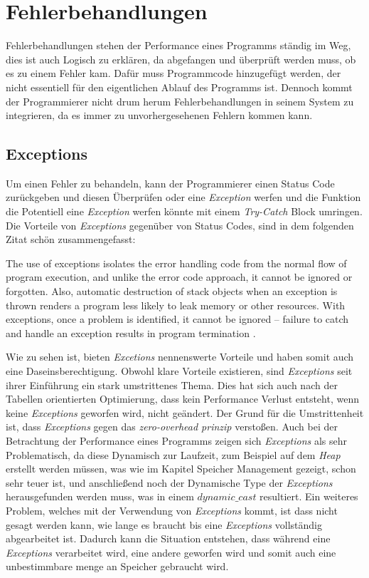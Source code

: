 \section{Fehlerbehandlungen}
Fehlerbehandlungen stehen der Performance eines Programms ständig im Weg, dies ist auch Logisch
zu erklären, da abgefangen und überprüft werden muss, ob es zu einem Fehler kam. Dafür muss
Programmcode hinzugefügt werden, der nicht essentiell für den eigentlichen Ablauf des Programms
ist. Dennoch kommt der Programmierer nicht drum herum Fehlerbehandlungen in seinem System zu
integrieren, da es immer zu unvorhergesehenen Fehlern kommen kann.

\subsection{Exceptions}
Um einen Fehler zu behandeln, kann der Programmierer einen Status Code zurückgeben und diesen
Überprüfen oder eine \emph{Exception} werfen und die Funktion die Potentiell eine
\emph{Exception} werfen könnte mit einem \emph{Try-Catch} Block umringen. Die Vorteile von
\emph{Exceptions} gegenüber von Status Codes, sind in dem folgenden Zitat schön zusammengefasst:

\begin{zitat}
    The use of exceptions isolates the error handling code from the normal flow of program
    execution, and unlike the error code approach, it cannot be ignored or forgotten. Also,
    automatic destruction of stack objects when an exception is thrown renders a program less likely to leak
    memory or other resources. With exceptions, once a problem is identified, it cannot be ignored –
    failure to catch and handle an exception results in program termination \cite{TechnicalReport}.
\end{zitat}

Wie zu sehen ist, bieten \emph{Excetions} nennenswerte Vorteile und haben somit auch eine
Daseinsberechtigung.
\newline
\newline
Obwohl klare Vorteile existieren, sind \emph{Exceptions} seit ihrer Einführung ein stark
umstrittenes Thema. Dies hat sich auch nach der Tabellen orientierten Optimierung, dass kein
Performance Verlust entsteht, wenn keine \emph{Exceptions} geworfen wird, nicht geändert. Der
Grund für die Umstrittenheit ist, dass \emph{Exceptions} gegen das \emph{zero-overhead prinzip}
verstoßen. Auch bei der Betrachtung der Performance eines Programms zeigen sich \emph{Exceptions}
als sehr Problematisch, da diese Dynamisch zur Laufzeit, zum Beispiel auf dem \emph{Heap}
erstellt werden müssen, was wie im Kapitel Speicher Management gezeigt, schon sehr teuer ist, und
anschließend noch der Dynamische Type der \emph{Exceptions} herausgefunden werden muss, was in
einem \emph{$dynamic\_cast$} resultiert. Ein weiteres Problem, welches mit der Verwendung von
\emph{Exceptions} kommt, ist dass nicht gesagt werden kann, wie lange es braucht bis eine
\emph{Exceptions} vollständig abgearbeitet ist. Dadurch kann die Situation entstehen, dass
während eine \emph{Exceptions} verarbeitet wird, eine andere geworfen wird und somit auch eine
unbestimmbare menge an Speicher gebraucht wird.\cite{HandsOn}

